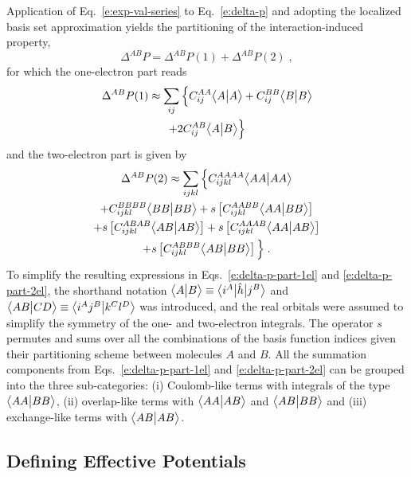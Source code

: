 Application of Eq.~\eqref{e:exp-val-series}
to Eq.~\eqref{e:delta-p} and adopting the localized basis set approximation
yields the partitioning of the interaction\hyp{}induced property,
%
\begin{equation}
 \Delta^{AB} P = \Delta^{AB} P(1) + \Delta^{AB} P(2) \;,
\end{equation}
%
for which the one\hyp{}electron part reads
%
\begin{multline} \label{e:delta-p-part-1el}
 \Delta^{AB} P(1) \approx
	\sum_{ij} \Big\{ 
	C^{AA}_{ij}  \BraKet{A}{A} +    %
	C^{BB}_{ij}  \BraKet{B}{B} \\ + %
2	C^{AB}_{ij}  \BraKet{A}{B}      %
	\Big\}
\end{multline}
%
and the two\hyp{}electron part is given by
%
\begin{multline} \label{e:delta-p-part-2el}
 \Delta^{AB} P(2) \approx
	\sum_{ijkl} \Big\{ 
	C^{AAAA}_{ijkl} \BraKet{AA}{AA} \\ +    %
	C^{BBBB}_{ijkl} \BraKet{BB}{BB} +  %
	{s} \left[ C^{AABB}_{ijkl} \BraKet{AA}{BB} \right] \\ + 
	{s} \left[ C^{ABAB}_{ijkl} \BraKet{AB}{AB} \right] + 
	{s} \left[ C^{AAAB}_{ijkl} \BraKet{AA}{AB} \right] \\ +
	{s} \left[ C^{ABBB}_{ijkl} \BraKet{AB}{BB} \right]
	\Big\} \;.
\end{multline}
%
To simplify the resulting expressions
in Eqs.~\eqref{e:delta-p-part-1el} and \eqref{e:delta-p-part-2el},
the shorthand notation $\bigl\langle {A} \bigl\lvert {B} \bigr\rangle \equiv \bigl\langle {i^A} \bigl\lvert {\hat{h}} \bigl\lvert {j^B} \bigr\rangle$ and 
$\bigl\langle {AB} \bigl\lvert {CD} \bigr\rangle \equiv \bigl\langle {i^Aj^B} \bigl\lvert {k^Cl^D} \bigr\rangle$
was introduced, and
the real orbitals 
were assumed to simplify the symmetry of the one\hyp{} and two\hyp{}electron integrals.
The operator $s$ permutes and sums over all the combinations of the basis function indices
given their partitioning scheme between molecules $A$ and $B$.
All the summation components from Eqs.~\eqref{e:delta-p-part-1el} and \eqref{e:delta-p-part-2el} 
can be grouped into the three
sub\hyp{}categories: (i) Coulomb\hyp{}like terms
with integrals of the type $\bigl\langle {AA} \bigl\lvert {BB} \bigr\rangle$, (ii) overlap\hyp{}like terms with $\bigl\langle {AA} \bigl\lvert {AB} \bigr\rangle$
and $\bigl\langle {AB} \bigl\lvert {BB} \bigr\rangle$ and (iii) exchange\hyp{}like terms with $\bigl\langle {AB} \bigl\lvert {AB} \bigr\rangle$.


\subsection{\label{ss:2.3}Defining Effective Potentials}

